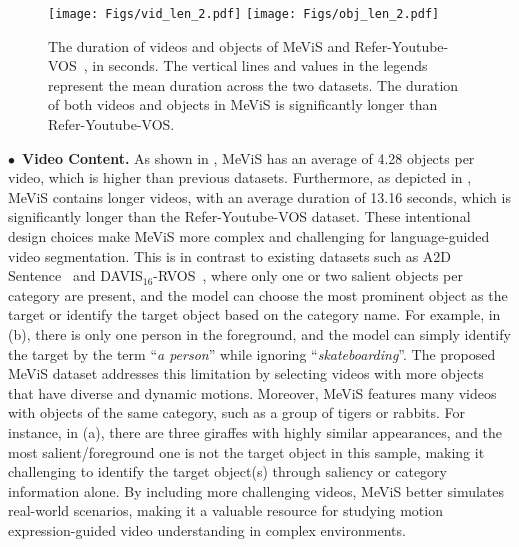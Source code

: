 \documentclass[10pt,twocolumn,letterpaper]{article}
\newcommand{\ourdataset}{MeViS\xspace}
\begin{document}
\begin{figure}
    \centering
    \hspace{-5mm}
    \texttt{[image: Figs/vid\_len\_2.pdf]}
    \hspace{-3mm}
    \texttt{[image: Figs/obj\_len\_2.pdf]}
    \hspace{-4mm}
    \vspace{-3mm}
    \caption{The duration of videos and objects of \ourdataset and Refer-Youtube-VOS~\cite{seo2020urvos}, in seconds. The vertical lines and values in the legends represent the mean duration across the two datasets. The duration of both videos and objects in \ourdataset is significantly longer than Refer-Youtube-VOS.}
    \label{fig:VideoContent2}
    \vspace{-5mm}
\end{figure}

\vspace{0.6mm}
\noindent$\bullet$~\textbf{Video Content.} As shown in , \ourdataset has an average of 4.28 objects per video, which is higher than previous datasets. Furthermore, as depicted in , \ourdataset contains longer videos, with an average duration of 13.16 seconds, which is significantly longer than the Refer-Youtube-VOS dataset. These intentional design choices make \ourdataset more complex and challenging for language-guided video segmentation. This is in contrast to existing datasets such as A2D Sentence~\cite{gavrilyuk2018actor} and DAVIS$_{16}$-RVOS~\cite{khoreva2018video}, where only one or two salient objects per category are present, and the model can choose the most prominent object as the target or identify the target object based on the category name. For example, in (b), there is only one person in the foreground, and the model can simply identify the target by the term {``\textit{a person}''} while ignoring {``\textit{skateboarding}''}. The proposed \ourdataset dataset addresses this limitation by selecting videos with more objects that have diverse and dynamic motions. Moreover, \ourdataset features many videos with objects of the same category, such as a group of tigers or rabbits. For instance, in (a), there are three giraffes with highly similar appearances, and the most salient/foreground one is not the target object in this sample, making it challenging to identify the target object(s) through saliency or category information alone. By including more challenging videos, \ourdataset better simulates real-world scenarios, making it a valuable resource for studying motion expression-guided video understanding in complex environments.
\end{document}
